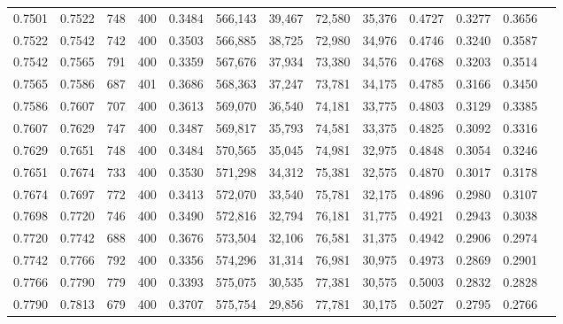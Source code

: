 \begin{tabular}{rrrrrrrrrrrrr}
0.7501 & 0.7522 &    748 &   400 &                                     0.3484 & 566,143 &  39,467 &  72,580 &  35,376 & 0.4727 & 0.3277 & 0.3656 \\
0.7522 & 0.7542 &    742 &   400 &                                     0.3503 & 566,885 &  38,725 &  72,980 &  34,976 & 0.4746 & 0.3240 & 0.3587 \\
0.7542 & 0.7565 &    791 &   400 &                                     0.3359 & 567,676 &  37,934 &  73,380 &  34,576 & 0.4768 & 0.3203 & 0.3514 \\
0.7565 & 0.7586 &    687 &   401 &                                     0.3686 & 568,363 &  37,247 &  73,781 &  34,175 & 0.4785 & 0.3166 & 0.3450 \\
0.7586 & 0.7607 &    707 &   400 &                                     0.3613 & 569,070 &  36,540 &  74,181 &  33,775 & 0.4803 & 0.3129 & 0.3385 \\
0.7607 & 0.7629 &    747 &   400 &                                     0.3487 & 569,817 &  35,793 &  74,581 &  33,375 & 0.4825 & 0.3092 & 0.3316 \\
0.7629 & 0.7651 &    748 &   400 &                                     0.3484 & 570,565 &  35,045 &  74,981 &  32,975 & 0.4848 & 0.3054 & 0.3246 \\
0.7651 & 0.7674 &    733 &   400 &                                     0.3530 & 571,298 &  34,312 &  75,381 &  32,575 & 0.4870 & 0.3017 & 0.3178 \\
0.7674 & 0.7697 &    772 &   400 &                                     0.3413 & 572,070 &  33,540 &  75,781 &  32,175 & 0.4896 & 0.2980 & 0.3107 \\
0.7698 & 0.7720 &    746 &   400 &                                     0.3490 & 572,816 &  32,794 &  76,181 &  31,775 & 0.4921 & 0.2943 & 0.3038 \\
0.7720 & 0.7742 &    688 &   400 &                                     0.3676 & 573,504 &  32,106 &  76,581 &  31,375 & 0.4942 & 0.2906 & 0.2974 \\
0.7742 & 0.7766 &    792 &   400 &                                     0.3356 & 574,296 &  31,314 &  76,981 &  30,975 & 0.4973 & 0.2869 & 0.2901 \\
0.7766 & 0.7790 &    779 &   400 &                                     0.3393 & 575,075 &  30,535 &  77,381 &  30,575 & 0.5003 & 0.2832 & 0.2828 \\
0.7790 & 0.7813 &    679 &   400 &                                     0.3707 & 575,754 &  29,856 &  77,781 &  30,175 & 0.5027 & 0.2795 & 0.2766 \\

\end{tabular}
